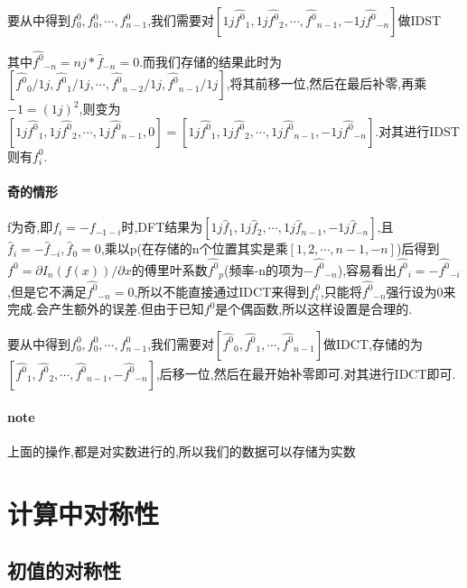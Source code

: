 \documentclass[UTF8]{ctexart}
\begin{document}
  要从中得到$f^0_0,f^0_0,\cdots,f^0_{n-1}$,我们需要对$[1j\hat{f^0}_1,1j\hat{f^0}_2,\cdots,\hat{f^0}_{n-1},-1j\hat{f^0}_{-n}]$做IDST
  
  其中$\hat{f^0}_{-n}=nj*\hat{f}_{-n}=0$.而我们存储的结果此时为$[\hat{f^0} _0/1j,\hat{f^0}_1/1j,\cdots,\hat{f^0}_{n-2}/1j,\hat{f^0}_{n-1}/1j]$,将其前移一位,然后在最后补零,再乘$-1=(1j)^2$,则变为$[1j\hat{f^0} _1,1j\hat{f^0}_2,\cdots,1j\hat{f^0}_{n-1},0]=[1j\hat{f^0} _1,1j\hat{f^0}_2,\cdots,1j\hat{f^0}_{n-1},-1j\hat{f^0}_{-n}]$.对其进行IDST则有$f^0_i$.
  
\paragraph{奇的情形}
 f为奇,即$f_i=-f_{-1-i}$时,DFT结果为$[1j\hat{f}_1,1j\hat{f}_2,\cdots,1j\hat{f}_{n-1},-1j\hat{f}_{-n}]$,且$\hat{f}_i=-\hat{f}_{-i},\hat{f}_{0}=0$,乘以p(在存储的n个位置其实是乘$[1,2,\cdots,n-1,-n]$)后得到$f^0=\partial I_n(f(x))/\partial x $的傅里叶系数$ \hat{f^0}_p$(频率-n的项为$-\hat{f^0}_{-n}$),容易看出$\hat{f^0}_i=-\hat{f^0}_{-i}$,但是它不满足$\hat{f^0}_{-n}=0$,所以不能直接通过IDCT来得到$f^0_i$,只能将$\hat{f^0} _{-n}$强行设为0来完成.会产生额外的误差.但由于已知$f^0$是个偶函数,所以这样设置是合理的.
 
 要从中得到$f^0_0,f^0_0,\cdots,f^0_{n-1}$,我们需要对$[\hat{f^0}_0,\hat{f^0}_1,\cdots,\hat{f^0}_{n-1}]$做IDCT,存储的为$[\hat{f^0}_1,\hat{f^0}_2,\cdots,\hat{f^0}_{n-1},-\hat{f^0}_{-n}]$,后移一位,然后在最开始补零即可.对其进行IDCT即可.
 
\paragraph{note}
上面的操作,都是对实数进行的,所以我们的数据可以存储为实数
 

 
 
\section{计算中对称性}

\subsection{初值的对称性}
\end{document}
